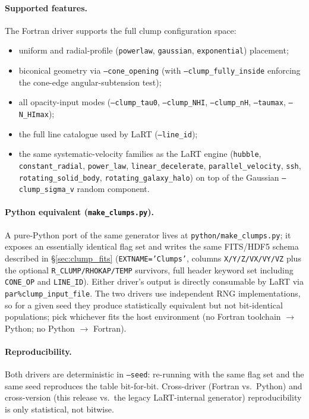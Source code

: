 \documentclass[english,a4paper]{my_memo}
\begin{document}
\paragraph{Supported features.}
The Fortran driver supports the full clump configuration space:
\begin{sloppypar}
\begin{itemize}
\item uniform and radial-profile (\texttt{powerlaw}, \texttt{gaussian},
      \texttt{exponential}) placement;
\item biconical geometry via \texttt{--cone\_opening} (with
      \texttt{--clump\_fully\_inside} enforcing the cone-edge
      angular-subtension test);
\item all opacity-input modes (\texttt{--clump\_tau0},
      \texttt{--clump\_NHI}, \texttt{--clump\_nH},
      \texttt{--taumax}, \texttt{--N\_HImax});
\item the full line catalogue used by LaRT (\texttt{--line\_id});
\item the same systematic-velocity families as the LaRT engine
      (\texttt{hubble}, \texttt{constant\_radial}, \texttt{power\_law},
      \texttt{linear\_decelerate}, \texttt{parallel\_velocity},
      \texttt{ssh}, \texttt{rotating\_solid\_body},
      \texttt{rotating\_galaxy\_halo}) on top of the Gaussian
      \texttt{--clump\_sigma\_v} random component.
\end{itemize}
\end{sloppypar}

\paragraph{Python equivalent (\texttt{make\_clumps.py}).}
A pure-Python port of the same generator lives at
\texttt{python/make\_clumps.py}; it exposes an essentially identical
flag set and writes the same FITS/HDF5 schema described in
\S\ref{sec:clump_fits} (\texttt{EXTNAME='Clumps'}, columns
\texttt{X/Y/Z/VX/VY/VZ} plus the optional
\texttt{R\_CLUMP/RHOKAP/TEMP} survivors, full header keyword set
including \texttt{CONE\_OP} and \texttt{LINE\_ID}).  Either driver's
output is directly consumable by LaRT via
\texttt{par\%clump\_input\_file}.  The two drivers use independent RNG
implementations, so for a given seed they produce statistically
equivalent but not bit-identical populations; pick whichever fits the
host environment (no Fortran toolchain $\rightarrow$ Python; no Python
$\rightarrow$ Fortran).

\paragraph{Reproducibility.}
Both drivers are deterministic in \texttt{--seed}: re-running with the
same flag set and the same seed reproduces the table bit-for-bit.
Cross-driver (Fortran vs.\ Python) and cross-version (this release vs.\
the legacy LaRT-internal generator) reproducibility is only
statistical, not bitwise.
\end{document}
